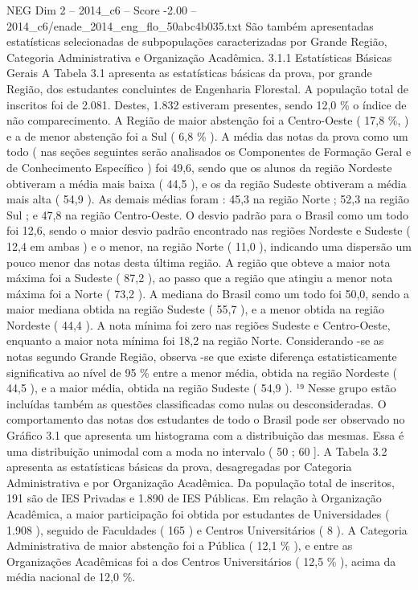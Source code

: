 \begin{textsample}{NEG Dim 2 – 2014\_c6 – Score -2.00 – 2014\_c6/enade\_2014\_eng\_flo\_50abc4b035.txt}
São também apresentadas estatísticas selecionadas de subpopulações caracterizadas por Grande Região, Categoria Administrativa e Organização Acadêmica. 3.1.1 Estatísticas Básicas Gerais A Tabela 3.1 apresenta as estatísticas básicas da prova, por grande Região, dos estudantes concluintes de Engenharia Florestal.
A população total de inscritos foi de 2.081.
Destes, 1.832 estiveram presentes, sendo 12,0 \% o índice de não comparecimento.
A Região de maior abstenção foi a Centro-Oeste ( 17,8 \%, ) e a de menor abstenção foi a Sul ( 6,8 \% ).
A média das notas da prova como um todo ( nas seções seguintes serão analisados os Componentes de Formação Geral e de Conhecimento Específico ) foi 49,6, sendo que os alunos da região Nordeste obtiveram a média mais baixa ( 44,5 ), e os da região Sudeste obtiveram a média mais alta ( 54,9 ).
As demais médias foram : 45,3 na região Norte ; 52,3 na região Sul ; e 47,8 na região Centro-Oeste.
O desvio padrão para o Brasil como um todo foi 12,6, sendo o maior desvio padrão encontrado nas regiões Nordeste e Sudeste ( 12,4 em ambas ) e o menor, na região Norte ( 11,0 ), indicando uma dispersão um pouco menor das notas desta última região.
A região que obteve a maior nota máxima foi a Sudeste ( 87,2 ), ao passo que a região que atingiu a menor nota máxima foi a Norte ( 73,2 ).
A mediana do Brasil como um todo foi 50,0, sendo a maior mediana obtida na região Sudeste ( 55,7 ), e a menor obtida na região Nordeste ( 44,4 ).
A nota mínima foi zero nas regiões Sudeste e Centro-Oeste, enquanto a maior nota mínima foi 18,2 na região Norte.
Considerando -se as notas segundo Grande Região, observa -se que existe diferença estatisticamente significativa ao nível de 95 \% entre a menor média, obtida na região Nordeste ( 44,5 ), e a maior média, obtida na região Sudeste ( 54,9 ). ¹⁹ Nesse grupo estão incluídas também as questões classificadas como nulas ou desconsideradas.
O comportamento das notas dos estudantes de todo o Brasil pode ser observado no Gráfico 3.1 que apresenta um histograma com a distribuição das mesmas.
Essa é uma distribuição unimodal com a moda no intervalo ( 50 ; 60 ].
A Tabela 3.2 apresenta as estatísticas básicas da prova, desagregadas por Categoria Administrativa e por Organização Acadêmica.
Da população total de inscritos, 191 são de IES Privadas e 1.890 de IES Públicas.
Em relação à Organização Acadêmica, a maior participação foi obtida por estudantes de Universidades ( 1.908 ), seguido de Faculdades ( 165 ) e Centros Universitários ( 8 ).
A Categoria Administrativa de maior abstenção foi a Pública ( 12,1 \% ), e entre as Organizações Acadêmicas foi a dos Centros Universitários ( 12,5 \% ), acima da média nacional de 12,0 \%.

\end{textsample}
